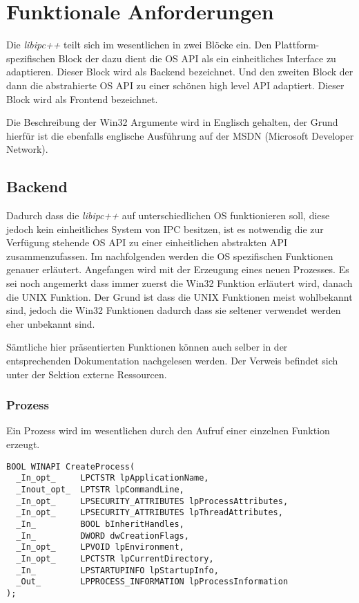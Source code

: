 \documentclass[a4paper]{book}
\begin{document}
\section{Funktionale Anforderungen}
Die \textit{libipc++} teilt sich im wesentlichen in zwei Blöcke ein. Den Plattform-spezifischen Block der dazu dient die OS API als ein einheitliches Interface zu adaptieren. Dieser Block wird als Backend bezeichnet. Und den zweiten Block der dann die abstrahierte OS API zu einer schönen high level API adaptiert. Dieser Block wird als Frontend bezeichnet.\newline

\noindent Die Beschreibung der Win32 Argumente wird in Englisch gehalten, der Grund hierfür ist die ebenfalls englische Ausführung auf der MSDN (Microsoft Developer Network).

\subsection{Backend}
Dadurch dass die \textit{libipc++} auf unterschiedlichen OS funktionieren soll, diese jedoch kein einheitliches System von IPC besitzen, ist es notwendig die zur Verfügung stehende OS API zu einer einheitlichen abstrakten API zusammenzufassen. Im nachfolgenden werden die OS spezifischen Funktionen genauer erläutert. Angefangen wird mit der Erzeugung eines neuen Prozesses. Es sei noch angemerkt dass immer zuerst die Win32 Funktion erläutert wird, danach die UNIX Funktion. Der Grund ist dass die UNIX Funktionen meist wohlbekannt sind, jedoch die Win32 Funktionen dadurch dass sie seltener verwendet werden eher unbekannt sind.\newline

\noindent Sämtliche hier präsentierten Funktionen können auch selber in der entsprechenden Dokumentation nachgelesen werden. Der Verweis befindet sich unter der Sektion externe Ressourcen.

\subsubsection{Prozess}
Ein Prozess wird im wesentlichen durch den Aufruf einer einzelnen Funktion erzeugt.

\lstset{language=[Visual]C++}
\begin{lstlisting}[caption={CreateProcess},frame=single]
BOOL WINAPI CreateProcess(
  _In_opt_     LPCTSTR lpApplicationName,
  _Inout_opt_  LPTSTR lpCommandLine,
  _In_opt_     LPSECURITY_ATTRIBUTES lpProcessAttributes,
  _In_opt_     LPSECURITY_ATTRIBUTES lpThreadAttributes,
  _In_         BOOL bInheritHandles,
  _In_         DWORD dwCreationFlags,
  _In_opt_     LPVOID lpEnvironment,
  _In_opt_     LPCTSTR lpCurrentDirectory,
  _In_         LPSTARTUPINFO lpStartupInfo,
  _Out_        LPPROCESS_INFORMATION lpProcessInformation
);
\end{lstlisting}
\end{document}
